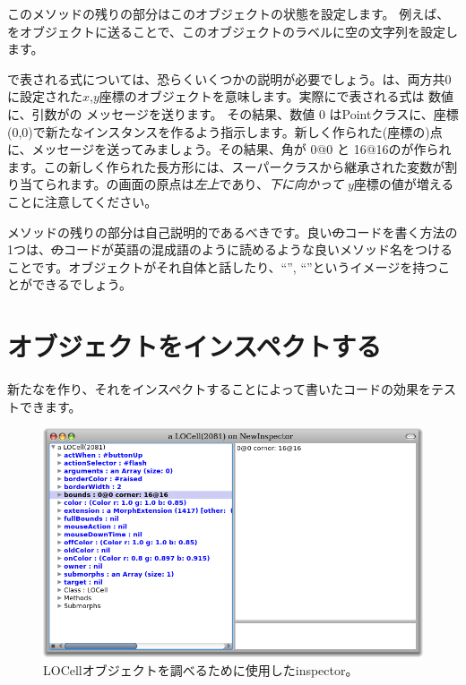 \documentclass[a4paper,10pt,twoside]{book}
\begin{document}
このメソッドの残りの部分はこのオブジェクトの状態を設定します。
例えば、をオブジェクトに送ることで、このオブジェクトのラベルに空の文字列を設定します。

で表される式については、恐らくいくつかの説明が必要でしょう。は、両方共0に設定された$x$,$y$座標のオブジェクトを意味します。実際にで表される式は 数値に、引数がの メッセージを送ります。
その結果、数値 0 はPointクラスに、座標(0,0)で新たなインスタンスを作るよう指示します。新しく作られた(座標の)点に、メッセージを送ってみましょう。その結果、角が 0@0 と 16@16のが作られます。この新しく作られた長方形には、スーパークラスから継承された変数が割り当てられます。\pharo の画面の原点は\emph{左上}であり、\emph{下に向かって} $y$座標の値が増えることに注意してください。

メソッドの残りの部分は自己説明的であるべきです。良い\st のコードを書く方法の1つは、\st のコードが英語の混成語のように読めるような良いメソッド名をつけることです。オブジェクトがそれ自体と話したり、``'', ``''というイメージを持つことができるでしょう。

\section{オブジェクトをインスペクトする}

新たなを作り、それをインスペクトすることによって書いたコードの効果をテストできます。


\begin{figure}[htbp]
   \centering
   \includegraphics[width=\textwidth]{LOCellInspector} 
   \caption{LOCellオブジェクトを調べるために使用したinspector。}
\end{figure}
\end{document}
